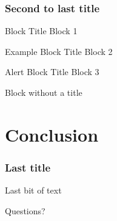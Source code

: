 \documentclass[
    11pt, %
    aspectratio=169, %
]{beamer}
\begin{document}
\begin{frame}
	\frametitle{Second to last title}
    	\begin{block}{Block Title}
    		Block 1
    	\end{block}
    	
    	\begin{exampleblock}{Example Block Title}
    		Block 2
    	\end{exampleblock}
    	
    	\begin{alertblock}{Alert Block Title}
    		Block 3
    	\end{alertblock}
    	
    	\begin{block}{} %
    		Block without a title
    	\end{block}
\end{frame}

\section{Conclusion}
\begin{frame}
	\frametitle{Last title}
		
	Last bit of text

\end{frame}


\appendix
{}

\begin{frame}[noframenumbering] %

	\begin{center}
            {\LARGE Questions?}
	\end{center}
 
\end{frame}
\end{document}
